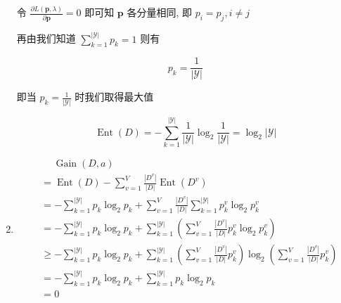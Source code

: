 \documentclass[answers]{exam}  %
\begin{document}
\begin{questions}
\begin{solution}
\begin{enumerate}
            令 $\displaystyle \frac{\partial L(\bm{p}, \lambda)}{\partial \bm{p}} = 0$ 即可知 $\bm{p}$ 各分量相同, 即 $p_{i} = p_{j}, i \neq j$

            再由我们知道 $\displaystyle \sum_{k=1}^{|\mathcal{Y}|}p_k = 1$ 则有

            $$
              p_k = \frac{1}{|\mathcal{Y}|}
            $$

            即当 $\displaystyle p_k = \frac{1}{|\mathcal{Y}|}$ 时我们取得最大值

            $$
              \operatorname{Ent}(D) = -\sum_{k=1}^{|\mathcal{Y}|}\frac{1}{|\mathcal{Y}|}\log_2\frac{1}{|\mathcal{Y}|} = \log_2 |\mathcal{Y}|
            $$

      \item

            $$
              \begin{aligned}
                 & \quad\ \operatorname{Gain}(D, a)                                                                                                                                    \\
                 & = \operatorname{Ent}(D) - \sum_{v=1}^{V}\frac{|D^{v}|}{|D|}\operatorname{Ent}(D^{v})                                                                                \\
                 & = -\sum_{k=1}^{|\mathcal{Y}|}p_k\log_2 p_k + \sum_{v=1}^{V}\frac{|D^{v}|}{|D|}\sum_{k=1}^{|\mathcal{Y}|}p_k^{v}\log_2 p_k^{v}                                       \\
                 & = -\sum_{k=1}^{|\mathcal{Y}|}p_k\log_2 p_k + \sum_{k=1}^{|\mathcal{Y}|}(\sum_{v=1}^{V}\frac{|D^{v}|}{|D|}p_k^{v}\log_2 p_k^{v})                                     \\
                 & \ge -\sum_{k=1}^{|\mathcal{Y}|}p_k\log_2 p_k + \sum_{k=1}^{|\mathcal{Y}|}(\sum_{v=1}^{V}\frac{|D^{v}|}{|D|}p_k^{v})\log_2(\sum_{v=1}^{V}\frac{|D^{v}|}{|D|}p_k^{v}) \\
                 & = -\sum_{k=1}^{|\mathcal{Y}|}p_k\log_2 p_k + \sum_{k=1}^{|\mathcal{Y}|}p_k\log_2p_k                                                                                 \\
                 & = 0                                                                                                                                                                 \\
              \end{aligned}
            $$


\end{enumerate}
\end{solution}
\end{questions}
\end{document}
